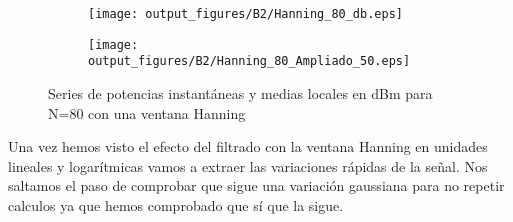 \documentclass{article}
\begin{document}
            
            
            
             \begin{figure}[h]
                \centering
                \begin{subfigure}
                    \centering          \texttt{[image: output\_figures/B2/Hanning\_80\_db.eps]}
               \end{subfigure}
               \begin{subfigure}
                    \centering          \texttt{[image: output\_figures/B2/Hanning\_80\_Ampliado\_50.eps]}
               \end{subfigure}    
               \caption{Series de potencias instantáneas y medias locales en dBm para N=80 con una ventana Hanning}
                \label{fig:sup_rugosas}
            \end{figure}
    
        \par Una vez hemos visto el efecto del filtrado con la ventana Hanning en unidades lineales y logarítmicas vamos a extraer las variaciones rápidas de la señal. Nos saltamos el paso de comprobar que sigue una variación gaussiana para no repetir calculos ya que hemos comprobado que sí que la sigue.
        \clearpage
\end{document}
